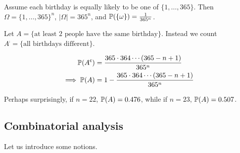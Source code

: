 \documentclass{../../template/note}
\begin{document}
\begin{example}
\begin{itemize}
            Assume each birthday is equally likely to be one of \(\{1, \dots, 365\}\). Then \(\Omega = \{1, \dots, 365\}^n\), \(| \Omega|  = 365^n\), and \(\mathbb P(\{\omega\}) = \frac{1}{365^n}\).

            Let \(A = \{\text{at least 2 people have the same birthday}\}\). Instead we count \(A^\comp = \{\text{all birthdays different}\}\).

            \begin{align*}
                \mathbb P(A^{\mathsf{c}}) &= \frac{365 \cdot 364 \cdots (365-n+1)}{365^n} \\
                \implies \mathbb P(A) &= 1 - \frac{365 \cdot 364 \cdots (365-n+1)}{365^n}
            \end{align*}
            
            Perhaps surprisingly, if \(n=22\), \(\mathbb P(A) = 0.476\), while if \(n=23\), \(\mathbb P(A) = 0.507\).
        \end{itemize}
    \end{example}
    
    \subsection{Combinatorial analysis}

    Let us introduce some notions.
\end{document}
